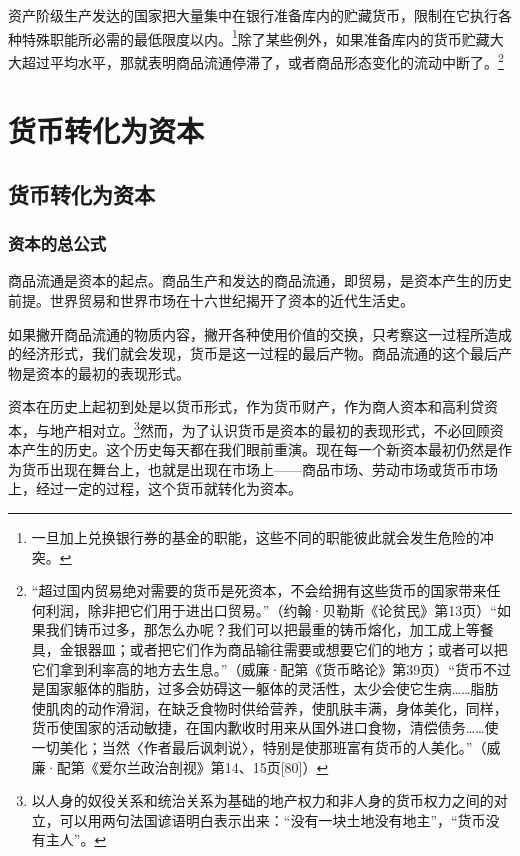 \documentclass{ctexbook}
\begin{document}
        资产阶级生产发达的国家把大量集中在银行准备库内的贮藏货币，限制在它执行各种特殊职能所必需的最低限度以内。\footnote{一旦加上兑换银行券的基金的职能，这些不同的职能彼此就会发生危险的冲突。}除了某些例外，如果准备库内的货币贮藏大大超过平均水平，那就表明商品流通停滞了，或者商品形态变化的流动中断了。\footnote{“超过国内贸易绝对需要的货币是死资本，不会给拥有这些货币的国家带来任何利润，除非把它们用于进出口贸易。”（约翰·贝勒斯《论贫民》第13页）“如果我们铸币过多，那怎么办呢？我们可以把最重的铸币熔化，加工成上等餐具，金银器皿；或者把它们作为商品输往需要或想要它们的地方；或者可以把它们拿到利率高的地方去生息。”（威廉·配第《货币略论》第39页）“货币不过是国家躯体的脂肪，过多会妨碍这一躯体的灵活性，太少会使它生病……脂肪使肌肉的动作滑润，在缺乏食物时供给营养，使肌肤丰满，身体美化，同样，货币使国家的活动敏捷，在国内歉收时用来从国外进口食物，清偿债务……使一切美化；当然〈作者最后讽刺说〉，特别是使那班富有货币的人美化。”（威廉·配第《爱尔兰政治剖视》第14、15页[80]）}

\theendnotes 

\part{货币转化为资本}

\chapter{货币转化为资本}

    \section{资本的总公式}

    商品流通是资本的起点。商品生产和发达的商品流通，即贸易，是资本产生的历史前提。世界贸易和世界市场在十六世纪揭开了资本的近代生活史。

    如果撇开商品流通的物质内容，撇开各种使用价值的交换，只考察这一过程所造成的经济形式，我们就会发现，货币是这一过程的最后产物。商品流通的这个最后产物是资本的最初的表现形式。

    资本在历史上起初到处是以货币形式，作为货币财产，作为商人资本和高利贷资本，与地产相对立。\footnote{以人身的奴役关系和统治关系为基础的地产权力和非人身的货币权力之间的对立，可以用两句法国谚语明白表示出来：“没有一块土地没有地主”，“货币没有主人”。}然而，为了认识货币是资本的最初的表现形式，不必回顾资本产生的历史。这个历史每天都在我们眼前重演。现在每一个新资本最初仍然是作为货币出现在舞台上，也就是出现在市场上——商品市场、劳动市场或货币市场上，经过一定的过程，这个货币就转化为资本。
\end{document}
